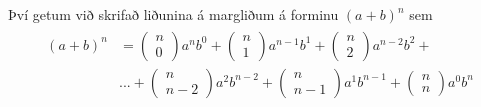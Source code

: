 \documentclass[a4paper,10pt,icelandic]{sphinxmanual}
\begin{document}
Því getum við skrifað liðunina á margliðum á forminu \((a+b)^n\) sem
\begin{equation*}
\begin{split}\begin{aligned}
        (a+b)^n &= \begin{pmatrix} n \\ 0 \end{pmatrix} a^nb^0 + \begin{pmatrix} n \\ 1 \end{pmatrix} a^{n-1}b^1 + \begin{pmatrix} n \\ 2 \end{pmatrix} a^{n-2}b^2 + \\ &...+ \begin{pmatrix} n \\ n-2 \end{pmatrix} a^2b^{n-2} + \begin{pmatrix} n \\ n-1 \end{pmatrix}a^1b^{n-1} + \begin{pmatrix} n \\ n \end{pmatrix}a^0b^n
\end{aligned}\end{split}
\end{equation*}
\end{document}
